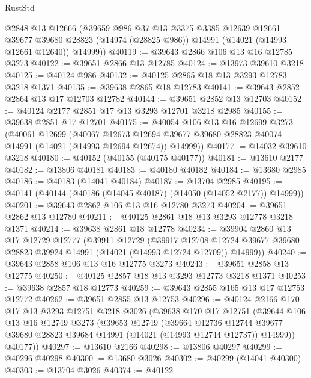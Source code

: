 \begin{lexlean}{RustStd}
\begin{coremodule}
      @2848
      @13
      @12666
      (@39659
        @986
        @37
        @13
        @3375
        @3385
        @12639
        @12661
        @39677
        @39680
        @28823
        (@14974 (@28825 @986))
        @14991
        (@14021 (@14993 @12661 @12640))
        @14999))
@40119 := @39643 @2866 @106 @13 @16 @12785 @3273
@40122 := @39651 @2866 @13 @12785
@40124 := @13973 @39610 @3218
@40125 := @40124 @986
@40132 := @40125 @2865 @18 @13 @3293 @12783 @3218 @1371
@40135 := @39638 @2865 @18 @12783
@40141 := @39643 @2852 @2864 @13 @17 @12703 @12782
@40144 := @39651 @2852 @13 @12703
@40152 := @40124 @2177 @2851 @17 @13 @3293 @12701 @3218 @2985
@40155 := @39638 @2851 @17 @12701
@40175 := @40054
    @106
    @13
    @16
    @12699
    @3273
    (@40061
      @12699
      (@40067
        @12673
        @12694
        @39677
        @39680
        @28823
        @40074
        @14991
        (@14021 (@14993 @12694 @12674))
        @14999))
@40177 := @14032 @39610 @3218
@40180 := @40152 (@40155 (@40175 @40177))
@40181 := @13610 @2177
@40182 := @13806 @40181
@40183 := @40180 @40182
@40184 := @13680 @2985
@40186 := @40183 (@14041 @40184)
@40187 := @13704 @2985
@40195 := @40141 (@40144 (@40186 (@14045 @40187) (@14050 (@14052 @2177)) @14999))
@40201 := @39643 @2862 @106 @13 @16 @12780 @3273
@40204 := @39651 @2862 @13 @12780
@40211 := @40125 @2861 @18 @13 @3293 @12778 @3218 @1371
@40214 := @39638 @2861 @18 @12778
@40234 := @39904
    @2860
    @13
    @17
    @12729
    @12777
    (@39911
      @12729
      (@39917
        @12708
        @12724
        @39677
        @39680
        @28823
        @39924
        @14991
        (@14021 (@14993 @12724 @12709))
        @14999))
@40240 := @39643 @2858 @106 @13 @16 @12775 @3273
@40243 := @39651 @2858 @13 @12775
@40250 := @40125 @2857 @18 @13 @3293 @12773 @3218 @1371
@40253 := @39638 @2857 @18 @12773
@40259 := @39643 @2855 @165 @13 @17 @12753 @12772
@40262 := @39651 @2855 @13 @12753
@40296 := @40124
    @2166
    @170
    @17
    @13
    @3293
    @12751
    @3218
    @3026
    (@39638
      @170
      @17
      @12751
      (@39644
        @106
        @13
        @16
        @12749
        @3273
        (@39653
          @12749
          (@39664
            @12736
            @12744
            @39677
            @39680
            @28823
            @39684
            @14991
            (@14021 (@14993 @12744 @12737))
            @14999))
        @40177))
@40297 := @13610 @2166
@40298 := @13806 @40297
@40299 := @40296 @40298
@40300 := @13680 @3026
@40302 := @40299 (@14041 @40300)
@40303 := @13704 @3026
@40374 := @40122

\end{coremodule}
\end{lexlean}
